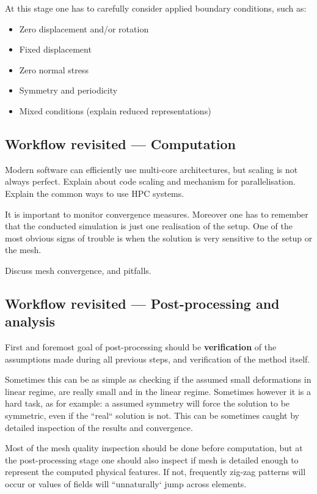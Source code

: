 \documentclass[12pt]{article}
\begin{document}
At this stage one has to carefully consider applied boundary conditions, such as:
\begin{itemize}
    \item Zero displacement and/or rotation
    \item Fixed displacement
    \item Zero normal stress
    \item Symmetry and periodicity
    \item Mixed conditions (explain reduced representations)
\end{itemize}

\subsection{Workflow revisited --- Computation}
Modern software can efficiently use multi-core architectures, but scaling is not always perfect. Explain about code scaling and mechanism for parallelisation. Explain the common ways to use HPC systems.

It is important to monitor convergence measures. Moreover one has to remember that the conducted simulation is just one realisation of the setup. One of the most obvious signs of trouble is when the solution is very sensitive to the setup or the mesh.

Discuss mesh convergence, and pitfalls.

\subsection{Workflow revisited --- Post-processing and analysis}
First and foremost goal of post-processing should be {\bf verification} of the assumptions made during all previous steps, and verification of the method itself.

Sometimes this can be as simple as checking if the assumed small deformations in linear regime, are really small and in the linear regime. Sometimes however it is a hard task, as for example: a assumed symmetry will force the solution to be symmetric, even if the ``real`` solution is not. This can be sometimes caught by detailed inspection of the results and convergence.

Most of the mesh quality inspection should be done before computation, but at the post-processing stage one should also inspect if mesh is detailed enough to represent the computed physical features. If not, frequently zig-zag patterns will occur or values of fields will ``unnaturally` jump across elements.
\end{document}

